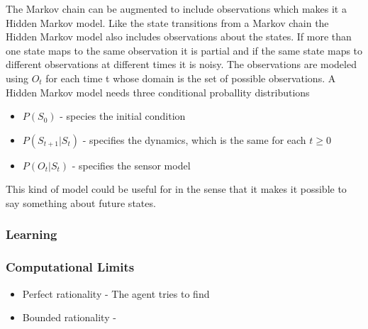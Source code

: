 The Markov chain can be augmented to include observations which makes it a
Hidden Markov model. Like the state transitions from a Markov chain the Hidden
Markov model also includes observations about the states. If more than one state
maps to the same observation it is partial and if the same state maps to
different observations at different times it is noisy. The observations are
modeled using $O_t$ for each time t whose domain is the set of possible
observations. A Hidden Markov model needs three conditional proballity
distributions
\begin{itemize}
  \item $P(S_0)$ - species the initial condition
  \item $P(S_{t+1}|S_t)$ - specifies the dynamics, which is the same for each $t
  \geq 0$
  \item $P(O_t|S_t)$ - specifies the sensor model
\end{itemize}

This kind of model could be useful for \name in the sense that it makes it
possible to say something about future states. 

\subsubsection{Learning}


\subsubsection{Computational Limits}



\begin{itemize}
  \item Perfect rationality - The agent tries to find 
  \item Bounded rationality -
\end{itemize}
